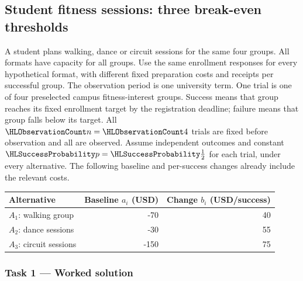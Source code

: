 \subsection{Student fitness sessions: three break-even thresholds}\label{prob:defects}
\label{prob:c4-agriculture}
A student plans walking, dance or circuit sessions for the same four groups. All formats have capacity for all groups. Use the same enrollment responses for every hypothetical format, with different fixed preparation costs and receipts per successful group.
The observation period is one university term. One trial is one of four preselected campus fitness-interest groups.
Success means that group reaches its fixed enrollment target by the registration deadline; failure means that group falls below its target.
All $\TrialCount{n}=\TrialCount{4}$ trials are fixed before observation and all are observed. 
Assume independent outcomes and constant $\SuccessProb{p}=\SuccessProb{\frac{1}{2}}$ for each trial, under every alternative. 
The following baseline and per-success changes already include the relevant costs.
\begin{center}\begin{tabular}{lrr}\toprule Alternative & Baseline $a_i$ (USD) & Change $b_i$ (USD/success)\\\midrule
$A_1$: walking group & -70 & 40\\
$A_2$: dance sessions & -30 & 55\\
$A_3$: circuit sessions & -150 & 75\\
\bottomrule\end{tabular}\end{center}
\clearpage\subsubsection*{Task 1 --- Worked solution}\label{sol:c4-agriculture-model}
